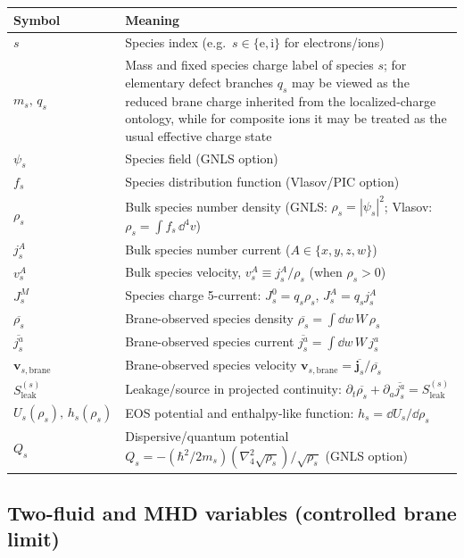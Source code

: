 \documentclass[11pt]{article}
\begin{document}
\begin{center}
\begin{tabular}{@{}ll@{}}
\toprule
Symbol & Meaning \\
\midrule
$s$ & Species index (e.g.\ $s\in\{\mathrm{e},\mathrm{i}\}$ for electrons/ions) \\
$m_s,\,q_s$ & Mass and fixed species charge label of species $s$; for elementary defect branches $q_s$ may be viewed as the reduced brane charge inherited from the localized-charge ontology, while for composite ions it may be treated as the usual effective charge state \\
$\psi_s$ & Species field (GNLS option) \\
$f_s$ & Species distribution function (Vlasov/PIC option) \\
$\rho_s$ & Bulk species number density (GNLS: $\rho_s=|\psi_s|^2$; Vlasov: $\rho_s=\int f_s\,\dd^4v$) \\
$j_s^A$ & Bulk species number current ($A\in\{x,y,z,w\}$) \\
$v_s^A$ & Bulk species velocity, $v_s^A\equiv j_s^A/\rho_s$ (when $\rho_s>0$) \\
$J_s^M$ & Species charge 5-current: $J_s^0=q_s\rho_s$, $J_s^A=q_s j_s^A$ \\
$\overline{\rho_s}$ & Brane-observed species density $\overline{\rho_s}=\int \dd w\,W\,\rho_s$ \\
$\overline{j_s^a}$ & Brane-observed species current $\overline{j_s^a}=\int \dd w\,W\,j_s^a$ \\
$\mathbf{v}_{s,\mathrm{brane}}$ & Brane-observed species velocity $\mathbf{v}_{s,\mathrm{brane}}=\overline{\mathbf{j}_s}/\overline{\rho_s}$ \\
$S_{\mathrm{leak}}^{(s)}$ & Leakage/source in projected continuity: $\partial_t\overline{\rho_s}+\partial_a\overline{j_s^a}=S_{\mathrm{leak}}^{(s)}$ \\
$U_s(\rho_s),\,h_s(\rho_s)$ & EOS potential and enthalpy-like function: $h_s=\dd U_s/\dd\rho_s$ \\
$Q_s$ & Dispersive/quantum potential $Q_s=-(\hbar^2/2m_s)(\nabla_4^2\sqrt{\rho_s})/\sqrt{\rho_s}$ (GNLS option) \\
\bottomrule
\end{tabular}
\end{center}

\subsection*{Two-fluid and MHD variables (controlled brane limit)}
\end{document}
